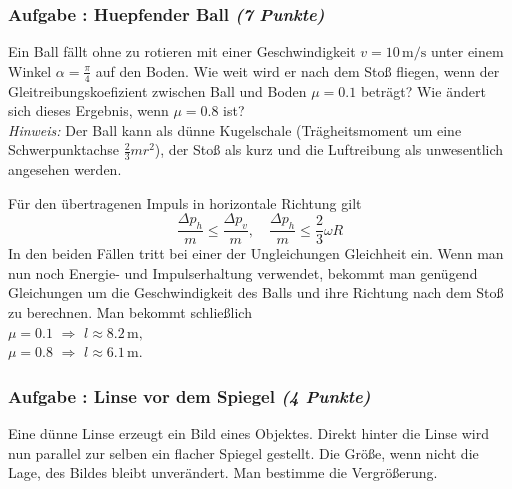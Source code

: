 \documentclass[12pt,a4paper]{article}
\newcommand{\unit}[1]{\,\mathrm{#1}}
\newcommand{\hinweis}{\emph{Hinweis:} }
\newcounter{numlabel}
\newenvironment{problem}[2]{\stepcounter{numlabel} \vspace{1ex} \subsubsection*{Aufgabe \the\value{numlabel}: #1 \emph{(#2 Punkte)}} \renewcommand{\Currentlabel}{Aufgabe \the\value{numlabel}: #1}}{

}
\begin{document}
\begin{problem}{Huepfender Ball}{7}
Ein Ball fällt ohne zu rotieren mit einer Geschwindigkeit $v=10 \unit{m/s}$ unter einem Winkel $\alpha = \frac\pi4$ auf den Boden. Wie weit wird er nach dem Stoß fliegen, wenn der Gleitreibungskoefizient zwischen Ball und Boden $\mu = 0.1$ beträgt? Wie ändert sich dieses Ergebnis, wenn $\mu = 0.8$ ist?\\
\hinweis Der Ball kann als dünne Kugelschale (Trägheitsmoment um eine Schwerpunktachse $\frac23 m r^2$), der Stoß als kurz und die Luftreibung als unwesentlich angesehen werden.
\begin{solution}
Für den übertragenen Impuls in horizontale Richtung gilt
\[
\frac{\Delta p_h}{m} \leq \frac{\Delta p_v}{m}, \quad \frac{\Delta p_h}{m} \leq \frac23 \omega R
\]
In den beiden Fällen tritt bei einer der Ungleichungen Gleichheit ein. Wenn man nun noch Energie- und Impulserhaltung verwendet, bekommt man genügend Gleichungen um die Geschwindigkeit des Balls und ihre Richtung nach dem Stoß zu berechnen. Man bekommt schließlich\\
$\mu = 0.1$ $\Rightarrow$ $l \approx 8.2 \unit{m},$\\
$\mu = 0.8$ $\Rightarrow$ $l \approx 6.1 \unit{m}.$
\end{solution}
\end{problem}












\begin{problem}{Linse vor dem Spiegel}{4}
Eine dünne Linse erzeugt ein Bild eines Objektes. Direkt hinter die Linse wird nun parallel zur selben ein flacher Spiegel gestellt. Die Größe, wenn nicht die Lage, des Bildes bleibt unverändert. Man bestimme die Vergrößerung.
\end{problem}
\end{document}
